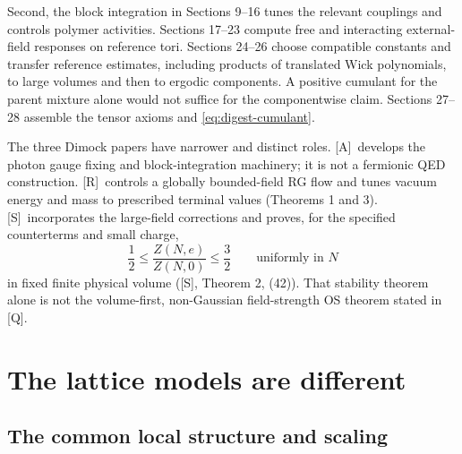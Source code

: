 \documentclass[11pt]{article}
\numberwithin{equation}{section}
\newcommand{\Q}{\textup{[Q]}}
\newcommand{\AG}{\textup{[A]}}
\newcommand{\UR}{\textup{[R]}}
\newcommand{\US}{\textup{[S]}}
\begin{document}
Second, the block integration in Sections 9--16 tunes the relevant
couplings and controls polymer activities. Sections 17--23 compute
free and interacting external-field responses on reference tori.
Sections 24--26 choose compatible constants and transfer reference
estimates, including products of translated Wick polynomials, to large
volumes and then to ergodic components. A positive cumulant for the
parent mixture alone would not suffice for the componentwise claim.
Sections 27--28 assemble the tensor axioms and
\eqref{eq:digest-cumulant}.

The three Dimock papers have narrower and distinct roles.
\AG\ develops the photon gauge fixing and block-integration machinery;
it is not a fermionic QED construction. \UR\ controls a globally
bounded-field RG flow and tunes vacuum energy and mass to prescribed
terminal values (Theorems 1 and 3). \US\ incorporates the large-field
corrections and proves, for the specified counterterms and small charge,
\begin{equation}
 \frac12\le\frac{Z(N,e)}{Z(N,0)}\le\frac32
 \qquad\text{uniformly in }N
 \label{eq:digest-stability}
\end{equation}
in fixed finite physical volume (\US, Theorem 2, (42)). That stability theorem alone is not
the volume-first, non-Gaussian field-strength OS theorem stated in \Q.

\section{The lattice models are different}

\subsection{The common local structure and scaling}
\end{document}
